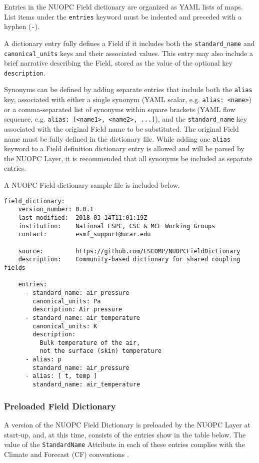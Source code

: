 Entries in the NUOPC Field dictionary are organized as YAML lists of maps. List items under the {\tt entries} keyword must be indented and preceded with a hyphen ({\tt -}).

A dictionary entry fully defines a Field if it includes both the {\tt standard\_name} and {\tt canonical\_units} keys and their associated values. This entry may also include a brief narrative describing the Field, stored as the value of the optional key {\tt description}.

Synonyms can be defined by adding separate entries that include both the {\tt alias} key, associated with either a single synonym (YAML scalar, e.g. {\tt alias: <name>}) or a comma-separated list of synonyms within square brackets (YAML flow sequence, e.g. {\tt alias: [<name1>, <name2>, ...]}), and the {\tt standard\_name} key associated with the original Field name to be substituted. The original Field name must be fully defined in the dictionary file. While adding one {\tt alias} keyword to a Field definition dictionary entry is allowed and will be parsed by the NUOPC Layer, it is recommended that all synonyms be included as separate entries.

A NUOPC Field dictionary sample file is included below.

\begin{verbatim}
field_dictionary:
    version_number: 0.0.1
    last_modified:  2018-03-14T11:01:19Z
    institution:    National ESPC, CSC & MCL Working Groups
    contact:        esmf_support@ucar.edu

    source:         https://github.com/ESCOMP/NUOPCFieldDictionary
    description:    Community-based dictionary for shared coupling fields

    entries:
      - standard_name: air_pressure
        canonical_units: Pa
        description: Air pressure
      - standard_name: air_temperature
        canonical_units: K
        description:
          Bulk temperature of the air,
          not the surface (skin) temperature
      - alias: p
        standard_name: air_pressure
      - alias: [ t, temp ]
        standard_name: air_temperature
\end{verbatim}


\subsubsection{Preloaded Field Dictionary}
\label{fd:default}

A version of the NUOPC Field Dictionary is preloaded by the NUOPC Layer at start-up, and, at this time, consists of the entries show in the table below. The value of the {\tt StandardName} Attribute in each of these entries complies with the Climate and Forecast (CF) conventions .


